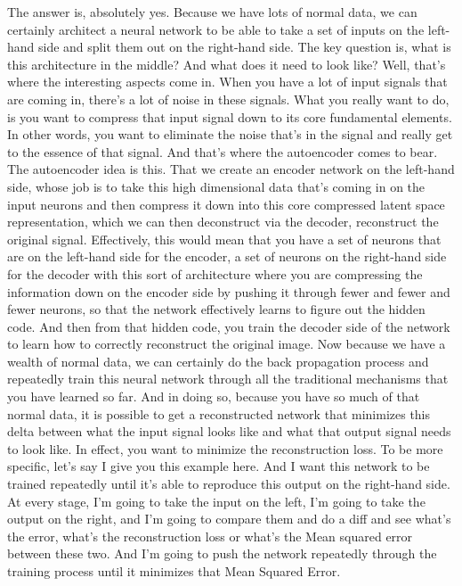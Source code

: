 The answer is, absolutely yes.
Because we have lots of normal data, we can certainly
architect a neural network to be able to take
a set of inputs on the left-hand side and split them out
on the right-hand side.
The key question is, what is this architecture in the middle?
And what does it need to look like?
Well, that's where the interesting aspects come in.
When you have a lot of input signals that are coming in,
there's a lot of noise in these signals.
What you really want to do, is you want to compress that input signal down
to its core fundamental elements.
In other words, you want to eliminate the noise that's in the signal
and really get to the essence of that signal.
And that's where the autoencoder comes to bear.
The autoencoder idea is this.
That we create an encoder network on the left-hand side,
whose job is to take this high dimensional data that's
coming in on the input neurons and then compress it down
into this core compressed latent space representation, which we can then
deconstruct via the decoder, reconstruct the original signal.
Effectively, this would mean that you have
a set of neurons that are on the left-hand side for the encoder, a set
of neurons on the right-hand side for the decoder with this sort
of architecture where you are compressing the information down
on the encoder side by pushing it through fewer and fewer and fewer
neurons, so that the network effectively learns to figure out the hidden code.
And then from that hidden code, you train the decoder side
of the network to learn how to correctly reconstruct the original image.
Now because we have a wealth of normal data,
we can certainly do the back propagation process
and repeatedly train this neural network through all the traditional mechanisms
that you have learned so far.
And in doing so, because you have so much of that normal data,
it is possible to get a reconstructed network that
minimizes this delta between what the input signal looks like
and what that output signal needs to look like.
In effect, you want to minimize the reconstruction loss.
To be more specific, let's say I give you this example here.
And I want this network to be trained repeatedly
until it's able to reproduce this output on the right-hand side.
At every stage, I'm going to take the input on the left,
I'm going to take the output on the right,
and I'm going to compare them and do a diff
and see what's the error, what's the reconstruction loss
or what's the Mean squared error between these two.
And I'm going to push the network repeatedly through the training process
until it minimizes that Mean Squared Error.
